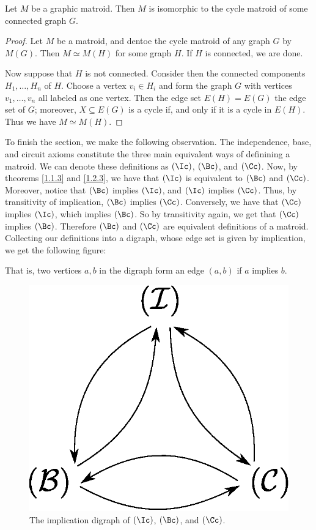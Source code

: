 \begin{theorem}\label{1.2.5}
    Let $M$ be a graphic matroid. Then $M$ is isomorphic to the cycle matroid of
    some connected graph $G$.
\end{theorem}
\begin{proof}
    Let $M$ be a matroid, and dentoe the cycle matroid of any graph $G$ by
    $M(G)$. Then $M \simeq M(H)$ for some graph $H$. If  $H$ is connected, we
    are done.

    Now suppose that  $H$ is not connected. Consider then the connected
    components  $H_1, \dots, H_n$ of $H$. Choose a vertex  $v_i \in H_i$ and
    form the graph  $G$ with vertices  $v_1, \dots, v_n$ all labeled as one
    vertex. Then the edge set $E(H)=E(G)$ the edge set of $G$; moreover, $X
    \subseteq E(G)$ is a cycle if, and only if it is a cycle in $E(H)$. Thus we
    have $M \simeq M(H)$.
\end{proof}

To finish the section, we make the following observation. The independence,
base, and circuit axioms constitute the three main equivalent ways of definining
a matroid. We can denote these definitions as $(\Ic)$, $(\Bc)$, and $(\Cc)$.
Now, by theorems \ref{1.1.3} and  \ref{1.2.3}, we have that $(\Ic)$ is
equivalent to  $(\Bc)$ and $(\Cc)$. Moreover, notice that $(\Bc)$ implies
$(\Ic)$, and $(\Ic)$ implies $(\Cc)$. Thus, by transitivity of implication,
$(\Bc)$ implies $(\Cc)$. Conversely, we have that $(\Cc)$ implies $(\Ic)$, which
implies $(\Bc)$. So by transitivity again, we get that $(\Cc)$ implies $(\Bc)$.
Therefore $(\Bc)$ and $(\Cc)$ are equivalent definitions of a matroid. Collecting
our definitions into a digraph, whose edge set is given by implication,
we get the following figure:
\begin{remark}
    That is, two vertices $a,b$ in the digraph form an edge  $(a,b)$ if $a$
    implies  $b$.
\end{remark}

\begin{figure}[h]
    \centering
    \includegraphics[scale=0.5]{Figures/Chapter1/equiv_def_1.eps}
    \caption{The implication digraph of $(\Ic)$, $(\Bc)$, and $(\Cc)$.}
    \label{fig_1.5}
\end{figure}
